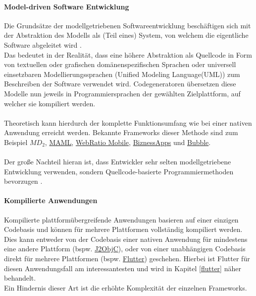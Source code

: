 \paragraph{Model-driven Software Entwicklung}
Die Grundsätze der modellgetriebenen Softwareentwicklung beschäftigen sich mit der Abstraktion des Modells als (Teil eines) System, von welchem die eigentliche Software abgeleitet wird \cite{stahl2006}.\\
Das bedeutet in der Realität, dass eine höhere Abstraktion als Quellcode in Form von textuellen oder grafischen domänenspezifischen Sprachen oder universell einsetzbaren Modellierungssprachen (Unified Modeling Language(UML)) zum Beschreiben der Software verwendet wird. 
Codegeneratoren übersetzen diese Modelle nun jeweils in Programmiersprachen der gewählten Zielplattform, auf welcher sie kompiliert werden.\\
\\
Theoretisch kann hierdurch der komplette Funktionsumfang wie bei einer nativen Anwendung erreicht werden.
Bekannte Frameworks dieser Methode sind zum Beispiel \href{https://www.wi.uni-muenster.de/sites/wi/files/public/department/pi/publications/heitkoetter/cross-platform-model-driven-development-of-mobile-applications-with-md2.pdf}{$M\!D_2$}, \href{https://www.sciencedirect.com/science/article/abs/pii/S1477842417301215}{MAML}, \href{https://www.webratio.com/site/content/en/home}{WebRatio Mobile}, \href{https://www.biznessapps.com/}{BiznessApps} und \href{https://bubble.io/}{Bubble}.\\
\\
Der große Nachteil hieran ist, dass Entwickler sehr selten modellgetriebene Entwicklung verwenden, sondern Quellcode-basierte Programmiermethoden bevorzugen \cite{bjorn-hansen2020}.
\paragraph{Kompilierte Anwendungen}
\label{compilierte_anwendungen}
Kompilierte plattformübergreifende Anwendungen basieren auf einer einzigen Codebasis und können für mehrere Plattformen vollständig kompiliert werden. 
Dies kann entweder von der Codebasis einer nativen Anwendung für mindestens eine andere Plattform (bspw. \href{https://developers.google.com/j2objc/}{J2ObjC}), oder von einer unabhängigen Codebasis direkt für mehrere Plattformen (bspw. \href{https://flutter.dev/}{Flutter}) geschehen.
Hierbei ist Flutter für diesen Anwendungsfall am interessantesten und wird in Kapitel \ref{flutter} näher behandelt.\\
Ein Hindernis dieser Art ist die erhöhte Komplexität der einzelnen Frameworks.

